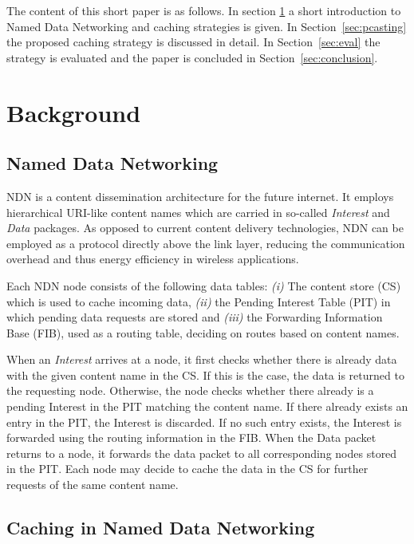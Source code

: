 \documentclass[conference]{IEEEtran}
\begin{document}
The content of this short paper is as follows. In section \ref{sec:background} a short introduction to Named Data Networking and caching strategies is given. In Section~\ref{sec:pcasting} the proposed caching strategy is discussed in detail. In Section~\ref{sec:eval} the strategy is evaluated and the paper is concluded in Section~\ref{sec:conclusion}.

\section{Background}
\label{sec:background}

\subsection{Named Data Networking}

NDN is a content dissemination architecture for the future internet. It employs hierarchical URI-like content names which are carried in so-called \textit{Interest} and \textit{Data} packages. As opposed to current content delivery technologies, NDN can be employed as a protocol directly above the link layer\cite{Baccelli2014}, reducing the communication overhead and thus energy efficiency in wireless applications.

Each NDN node consists of the following data tables:
    \textit{(i)} The content store (CS) which is used to cache incoming data,
    \textit{(ii)} the Pending Interest Table (PIT) in which pending data requests are stored and
    \textit{(iii)} the Forwarding Information Base (FIB), used as a routing table, deciding on routes based on content names.

When an \textit{Interest} arrives at a node, it first checks whether there is already data with the given content name in the CS. If this is the case, the data is returned to the requesting node. Otherwise, the node checks whether there already is a pending Interest in the PIT matching the content name. If there already exists an entry in the PIT, the Interest is discarded. If no such entry exists, the Interest is forwarded using the routing information in the FIB. When the Data packet returns to a node, it forwards the data packet to all corresponding nodes stored in the PIT. Each node may decide to cache the data in the CS for further requests of the same content name.

\subsection{Caching in Named Data Networking}
\end{document}
